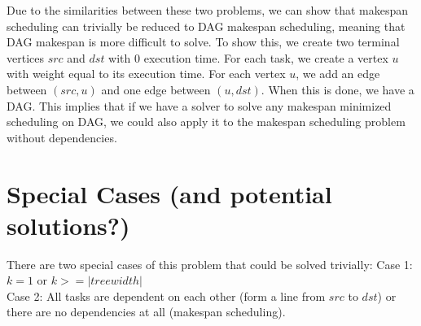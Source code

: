 \documentclass{article}
\begin{document}
Due to the similarities between these two problems, we can show that makespan
scheduling can trivially be reduced to DAG makespan scheduling, meaning
that DAG makespan is more difficult to solve. To show this,
we create two terminal vertices $src$ and $dst$ with 0 execution time. For each
task, we create a vertex $u$ with weight equal to its execution time. For each
vertex $u$, we add an edge between $(src,u)$ and one edge between $(u,dst)$.
When this is done, we have a DAG.
This implies that if we have a solver to solve any makespan minimized
scheduling on DAG, we could also apply it to the makespan scheduling problem
without dependencies.

\section{Special Cases (and potential solutions?)}
There are two special cases of this problem that could be solved trivially:
Case 1: $k = 1$ or $k >= |treewidth|$ \\
Case 2: All tasks are dependent on each other (form a line from $src$ to $dst$)
or there are no dependencies at all (makespan scheduling).



\end{document}
